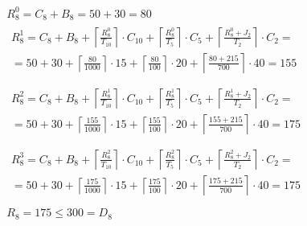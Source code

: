 \begin{gather*}
  R_8^0 = C_8 + B_8 = 50 + 30 = 80 \\
  \begin{multlined}
    R_8^1 = C_8 + B_8 + \left\lceil\frac{R_8^0}{T_{10}}\right\rceil\cdot C_{10} + %
    \left\lceil\frac{R_8^0}{T_5}\right\rceil\cdot C_5 + %
    \left\lceil\frac{R_8^0 + J_2}{T_2}\right\rceil\cdot C_2 = \\%
    = 50 + 30 + \left\lceil\frac{80}{1000}\right\rceil\cdot 15 + %
    \left\lceil\frac{80}{100}\right\rceil\cdot 20 + %
    \left\lceil\frac{80 + 215}{700}\right\rceil\cdot 40 = 155 \\
  \end{multlined} \\
  \begin{multlined}
    R_8^2 = C_8 + B_8 + \left\lceil\frac{R_8^1}{T_{10}}\right\rceil\cdot C_{10} + %
    \left\lceil\frac{R_8^1}{T_5}\right\rceil\cdot C_5 + %
    \left\lceil\frac{R_8^1 + J_2}{T_2}\right\rceil\cdot C_2 = \\%
    = 50 + 30 + \left\lceil\frac{155}{1000}\right\rceil\cdot 15 + %
    \left\lceil\frac{155}{100}\right\rceil\cdot 20 + %
    \left\lceil\frac{155 + 215}{700}\right\rceil\cdot 40 = 175 \\
  \end{multlined} \\
  \begin{multlined}
    R_8^3 = C_8 + B_8 + \left\lceil\frac{R_8^2}{T_{10}}\right\rceil\cdot C_{10} + %
    \left\lceil\frac{R_8^2}{T_5}\right\rceil\cdot C_5 + %
    \left\lceil\frac{R_8^2 + J_2}{T_2}\right\rceil\cdot C_2 = \\%
    = 50 + 30 + \left\lceil\frac{175}{1000}\right\rceil\cdot 15 + %
    \left\lceil\frac{175}{100}\right\rceil\cdot 20 + %
    \left\lceil\frac{175 + 215}{700}\right\rceil\cdot 40 = 175 \\
  \end{multlined} \\
  R_8 = 175 \le 300 = D_8
\end{gather*}

